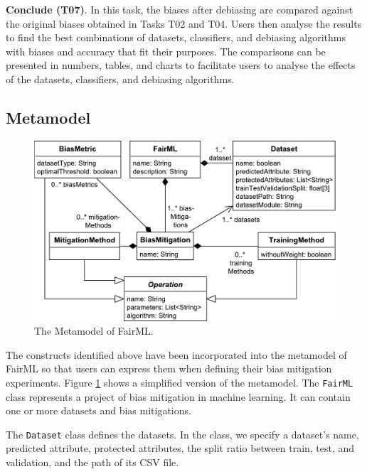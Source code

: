 \documentclass[sigconf]{acmart}
\begin{document}
{		\textbf{Conclude (T07)}. In this task, the biases after debiasing are compared against the original biases obtained in Tasks T02 and T04. Users then analyse the results to find the best combinations of datasets, classifiers, and debiasing algorithms with biases and accuracy that fit their purposes. The comparisons can be presented in numbers, tables, and charts to facilitate users to analyse the effects of the datasets, classifiers, and debiasing algorithms. 
		
		\subsection{Metamodel}
		\label{sec:metamodel}
		
		\begin{figure}
			\includegraphics[width=\linewidth]{figures/metamodel}
			\caption{The Metamodel of FairML.}
			\label{fig:metamodel}
		\end{figure}
		
		The constructs identified above have been incorporated into the metamodel of FairML so that users can express them when defining their bias mitigation experiments. Figure \ref{fig:metamodel} shows a simplified version of the metamodel. The \texttt{FairML} class represents a project of bias mitigation in machine learning. It can contain one or more datasets and bias mitigations. 
		
		The \texttt{Dataset} class defines the datasets. In the class, we specify a dataset's name, predicted attribute, protected attributes, the split ratio between train, test, and validation, and the path of its CSV file.
		
}
\end{document}
